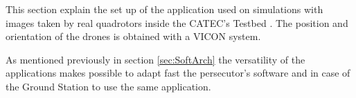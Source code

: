 This section explain the set up of the application used on simulations with images taken by real quadrotors inside the CATEC's Testbed \cite{CATEC}. The position and orientation of the drones is obtained with a VICON system.

As mentioned previously in section \ref{sec:SoftArch} the versatility of the applications makes possible to adapt fast the persecutor's software and in case of the Ground Station to use the same application. 